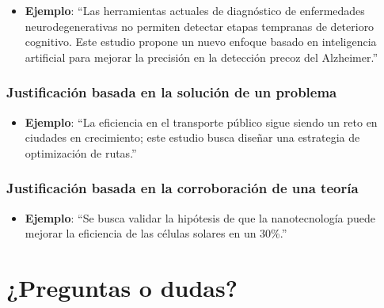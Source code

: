 \documentclass[
  letterpaper,
  DIV=11,
  numbers=noendperiod]{scrartcl}
\providecommand{\tightlist}{%
  \setlength{\itemsep}{0pt}\setlength{\parskip}{0pt}}
\begin{document}
\begin{itemize}
\tightlist
\item
  \textbf{Ejemplo}: ``Las herramientas actuales de diagnóstico de
  enfermedades neurodegenerativas no permiten detectar etapas tempranas
  de deterioro cognitivo. Este estudio propone un nuevo enfoque basado
  en inteligencia artificial para mejorar la precisión en la detección
  precoz del Alzheimer.''
\end{itemize}

\subsubsection{Justificación basada en la solución de un
problema}\label{justificaciuxf3n-basada-en-la-soluciuxf3n-de-un-problema}

\begin{itemize}
\tightlist
\item
  \textbf{Ejemplo}: ``La eficiencia en el transporte público sigue
  siendo un reto en ciudades en crecimiento; este estudio busca diseñar
  una estrategia de optimización de rutas.''
\end{itemize}

\subsubsection{Justificación basada en la corroboración de una
teoría}\label{justificaciuxf3n-basada-en-la-corroboraciuxf3n-de-una-teoruxeda}

\begin{itemize}
\tightlist
\item
  \textbf{Ejemplo}: ``Se busca validar la hipótesis de que la
  nanotecnología puede mejorar la eficiencia de las células solares en
  un 30\%.''
\end{itemize}

\section{¿Preguntas o dudas?}\label{preguntas-o-dudas}
\end{document}
